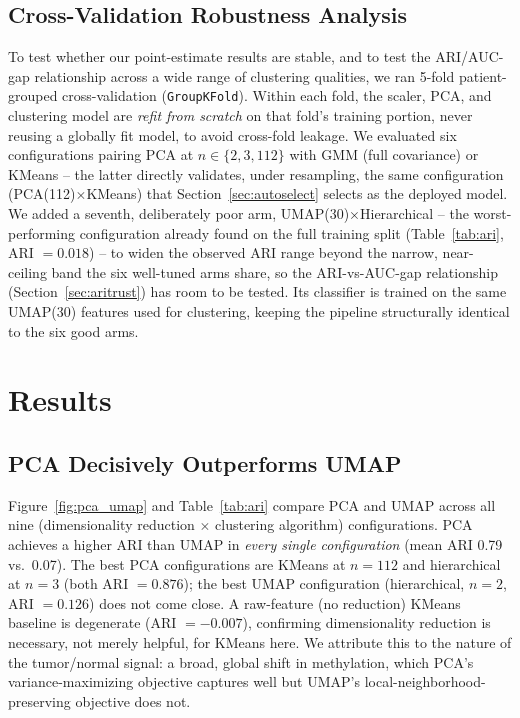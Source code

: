 \documentclass[sigconf]{acmart}
\begin{document}
\subsection{Cross-Validation Robustness Analysis}
\label{sec:cvmethods}
To test whether our point-estimate results are stable, and to test the ARI/AUC-gap relationship across a wide range of clustering qualities, we ran 5-fold patient-grouped cross-validation (\texttt{GroupKFold}). Within each fold, the scaler, PCA, and clustering model are \emph{refit from scratch} on that fold's training portion, never reusing a globally fit model, to avoid cross-fold leakage. We evaluated six configurations pairing PCA at $n\in\{2,3,112\}$ with GMM (full covariance) or KMeans -- the latter directly validates, under resampling, the same configuration (PCA(112)$\times$KMeans) that Section~\ref{sec:autoselect} selects as the deployed model. We added a seventh, deliberately poor arm, UMAP(30)$\times$Hierarchical -- the worst-performing configuration already found on the full training split (Table~\ref{tab:ari}, ARI $=0.018$) -- to widen the observed ARI range beyond the narrow, near-ceiling band the six well-tuned arms share, so the ARI-vs-AUC-gap relationship (Section~\ref{sec:aritrust}) has room to be tested. Its classifier is trained on the same UMAP(30) features used for clustering, keeping the pipeline structurally identical to the six good arms.

\section{Results}

\subsection{PCA Decisively Outperforms UMAP}
Figure~\ref{fig:pca_umap} and Table~\ref{tab:ari} compare PCA and UMAP across all nine (dimensionality reduction $\times$ clustering algorithm) configurations. PCA achieves a higher ARI than UMAP in \emph{every single configuration} (mean ARI 0.79 vs.\ 0.07). The best PCA configurations are KMeans at $n=112$ and hierarchical at $n=3$ (both ARI $=0.876$); the best UMAP configuration (hierarchical, $n=2$, ARI $=0.126$) does not come close. A raw-feature (no reduction) KMeans baseline is degenerate (ARI $=-0.007$), confirming dimensionality reduction is necessary, not merely helpful, for KMeans here. We attribute this to the nature of the tumor/normal signal: a broad, global shift in methylation, which PCA's variance-maximizing objective captures well but UMAP's local-neighborhood-preserving objective does not.
\end{document}
